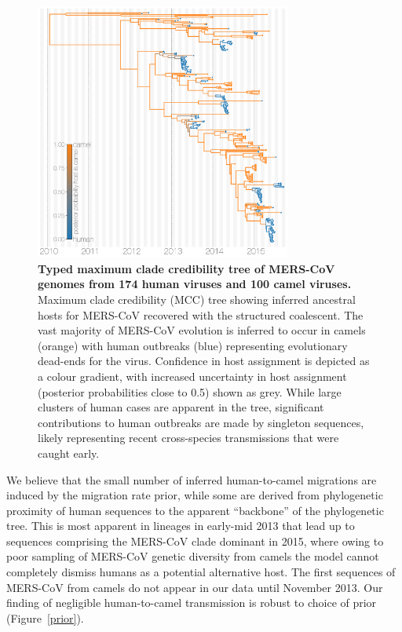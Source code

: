 \documentclass[11pt,oneside,letterpaper]{article}
\begin{document}
\begin{figure}[h]
 \centering
	\includegraphics[width=0.75\textwidth]{figures/mers_mcc.png}
	\caption{\textbf{Typed maximum clade credibility tree of MERS-CoV genomes from 174 human viruses and 100 camel viruses.}
	Maximum clade credibility (MCC) tree showing inferred ancestral hosts for MERS-CoV recovered with the structured coalescent.
	The vast majority of MERS-CoV evolution is inferred to occur in camels (orange) with human outbreaks (blue) representing evolutionary dead-ends for the virus.
  Confidence in host assignment is depicted as a colour gradient, with increased uncertainty in host assignment (posterior probabilities close to 0.5) shown as grey.
	While large clusters of human cases are apparent in the tree, significant contributions to human outbreaks are made by singleton sequences, likely representing recent cross-species transmissions that were caught early.
	}
	\label{mcc}
\end{figure}

We believe that the small number of inferred human-to-camel migrations are induced by the migration rate prior, while some are derived from phylogenetic proximity of human sequences to the apparent ``backbone'' of the phylogenetic tree.
This is most apparent in lineages in early-mid 2013 that lead up to sequences comprising the MERS-CoV clade dominant in 2015, where owing to poor sampling of MERS-CoV genetic diversity from camels the model cannot completely dismiss humans as a potential alternative host.
The first sequences of MERS-CoV from camels do not appear in our data until November 2013.
Our finding of negligible human-to-camel transmission is robust to choice of prior (Figure~\ref{prior}).
\end{document}

